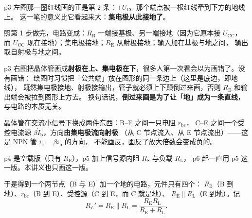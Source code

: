 \documentclass[11pt]{ctexart}
\begin{document}
p3 左图那一圈红线画的正是第 2 条：$+U_{\mathrm{CC}}$ 那个端点被一根红线牵到下方的地线上。
这一笔的意义比它看起来大：\textbf{集电极从此接地了}。


照第 1 步做完，电路变成：$R_{\mathrm{B}}$ 一端接基极、另一端接地（因为它原本接 $U_{\mathrm{CC}}$，
而 $U_{\mathrm{CC}}$ 现在接地）；集电极接地；$R_{\mathrm{E}}$ 从射极接地；输入加在基极与地之间，
输出取自射极与地之间。

p3 右图把晶体管画成\textbf{射极在上、集电极在下}，很多人第一次看会以为画错了。没有画错：
绘图时习惯把「公共端」放在图形的同一条边上（这里是底边，即地线），
既然集电极接地、射极接输出，管子就必须上下颠倒过来画，否则 $R_{\mathrm{E}}$ 和输出端会被拉到图形上方去。
换句话说，\textbf{倒过来画是为了让「地」成为一条直线}，与电路的本质无关。




晶体管在交流小信号下换成两件东西：B--E 之间一只电阻 $r_{\mathrm{be}}$，
C--E 之间一个受控电流源 $\beta\dot I_{\mathrm{b}}$，方向\textbf{由集电极流向射极}
（从 C 节点流入、从 E 节点流出）——这是 NPN 管 $i_{\mathrm{c}}=\beta i_{\mathrm{b}}$ 的方向，
不能画反，画反了放大倍数会变成负的。

p4 是空载版（只有 $R_{\mathrm{E}}$），p5 加上信号源内阻 $R_{\mathrm{S}}$ 与负载 $R_{\mathrm{L}}$，
p6 起一直用 p5 这一版。本讲义也只画这一版。

于是得到一个两节点（B 与 E）加一个地的电路，元件只有四个：
$R_{\mathrm{B}}$（B 到地）、$r_{\mathrm{be}}$（B 到 E）、受控源（C 到 E，而 C 就是地）、
$R_{\mathrm{E}}\parallel R_{\mathrm{L}}$（E 到地）。记
\[
R_L'=R_{\mathrm{E}}\parallel R_{\mathrm{L}}=\frac{R_{\mathrm{E}}R_{\mathrm{L}}}{R_{\mathrm{E}}+R_{\mathrm{L}}} .
\]

\end{document}
